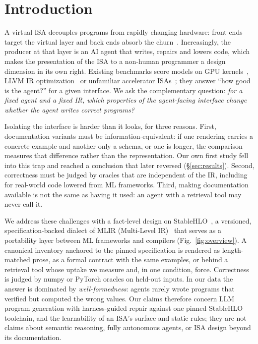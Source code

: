 \documentclass[conference]{IEEEtran}
\begin{document}
\section{Introduction}
A virtual ISA decouples programs from rapidly changing hardware: front ends target the virtual layer and back ends absorb the churn~\cite{lattner2004llvm,lattner2021mlir}. Increasingly, the producer at that layer is an AI agent that writes, repairs and lowers code, which makes the presentation of the ISA to a non-human programmer a design dimension in its own right. Existing benchmarks score models on GPU kernels~\cite{ouyang2025kernelbench,li2025tritonbench,guan2026tritongym}, LLVM IR optimization~\cite{yang2026cirbench} or unfamiliar accelerator ISAs~\cite{nie2026kernelcraft}; they answer ``how good is the agent?'' for a given interface. We ask the complementary question: \emph{for a fixed agent and a fixed IR, which properties of the agent-facing interface change whether the agent writes correct programs?}

Isolating the interface is harder than it looks, for three reasons. First, documentation variants must be information-equivalent: if one rendering carries a concrete example and another only a schema, or one is longer, the comparison measures that difference rather than the representation. Our own first study fell into this trap and reached a conclusion that later reversed (\S\ref{sec:results}). Second, correctness must be judged by oracles that are independent of the IR, including for real-world code lowered from ML frameworks. Third, making documentation available is not the same as having it used: an agent with a retrieval tool may never call it.

We address these challenges with a fact-level design on StableHLO~\cite{stablehlospec}, a versioned, specification-backed dialect of MLIR (Multi-Level IR)~\cite{lattner2021mlir} that serves as a portability layer between ML frameworks and compilers (Fig.~\ref{fig:overview}). A canonical inventory anchored to the pinned specification is rendered as length-matched prose, as a formal contract with the same examples, or behind a retrieval tool whose uptake we measure and, in one condition, force. Correctness is judged by numpy or PyTorch oracles on held-out inputs. In our data the answer is dominated by \emph{well-formedness}: agents rarely wrote programs that verified but computed the wrong values. Our claims therefore concern LLM program generation with harness-guided repair against one pinned StableHLO toolchain, and the learnability of an ISA's surface and static rules; they are not claims about semantic reasoning, fully autonomous agents, or ISA design beyond its documentation.
\end{document}
